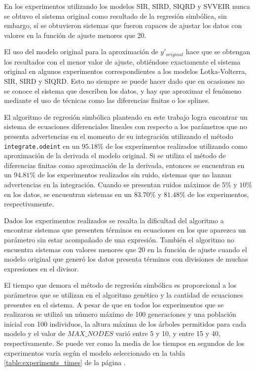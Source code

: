 En los experimentos utilizando los modelos SIR, SIRD, SIQRD y SVVEIR nunca se obtuvo el sistema original como resultado de la regresión simbólica, sin embargo, sí se obtuvieron sistemas que fueron capaces de ajustar los datos con valores en la función de ajuste menores que 20.

El uso del modelo original para la aproximación de $y'_{original}$ hace que se obtengan los resultados con el menor valor de ajuste, obtiéndose exactamente el sistema original en algunos experimentos correspondientes a los modelos Lotka-Volterra, SIR, SIRD y SIQRD. Esto no siempre se puede hacer dado que en ocasiones no se conoce el sistema que describen los datos, y hay que aproximar el fenómeno mediante el uso de técnicas como las diferencias finitas o los splines.

El algoritmo de regresión simbólica planteado en este trabajo logra encontrar un sistema de ecuaciones diferenciales lineales con respecto a los parámetros que no presenta advertencias en el momento de su integración utilizando el método \texttt{integrate.odeint} en un $95.18\%$ de los experimentos realizados utilizando como aproximación de la derivada el modelo original. Si se utiliza el método de diferencias finitas como aproximación de la derivada, entonces se encuentran en un $94.81\%$ de los experimentos realizados sin ruido, sistemas que no lanzan advertencias en la integración. Cuando se presentan ruidos máximos de $5\%$ y $10\%$ en los datos, se encuentran sistemas en un $83.70\%$ y $81.48\%$ de los experimentos, respectivamente.

Dados los experimentos realizados se resalta la dificultad del algoritmo a encontrar sistemas que presenten términos en ecuaciones en los que aparezca un parámetro sin estar acompañado de una expresión. También el algoritmo no encuentra sistemas con valores menores que 20 en la función de ajuste cuando el modelo original que generó los datos presenta términos con divisiones de muchas expresiones en el divisor.

El tiempo que demora el método de regresión simbólica es proporcional a los parámetros que se utilizan en el algoritmo genético y la cantidad de ecuaciones presentes en el sistema. A pesar de que en todos los experimentos que se realizaron se utilizó un número máximo de 100 generaciones y una población inicial con 100 individuos, la altura máxima de los árboles permitidos para cada modelo y el valor de $MAX\_NODES$ varió entre 5 y 10, y entre 15 y 40, respectivamente. Se puede ver como la media de los tiempos en segundos de los experimentos varía según el modelo seleccionado en la tabla \ref{table:experiments_times} de la página \pageref{table:experiments_times}.

